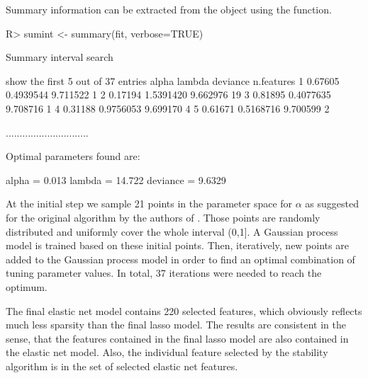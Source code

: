 \documentclass[nojss]{jss}
\begin{document}
Summary information can be extracted from the  object using the  function.
\begin{Schunk}
\begin{Sinput}
R> sumint <- summary(fit, verbose=TRUE)
\end{Sinput}
\begin{Soutput}
Summary interval search 

show the first 5 out of 37 entries
    alpha    lambda deviance n.features
1 0.67605 0.4939544 9.711522          1
2 0.17194 1.5391420 9.662976         19
3 0.81895 0.4077635 9.708716          1
4 0.31188 0.9756053 9.699170          4
5 0.61671 0.5168716 9.700599          2

..............................

 Optimal parameters found are: 

alpha =  0.013 	 lambda =  14.722 deviance =  9.6329
\end{Soutput}
\end{Schunk}

At the initial step we sample 21 points in the parameter space for $\alpha$ as suggested for the original algorithm by the authors of \citep{froehlich2005}. Those points are randomly distributed and uniformly cover the whole interval 
(0,1]. A Gaussian process model is trained based on these initial points. Then, iteratively, new points are added to the Gaussian process model in order to find an optimal combination of tuning parameter values. In total, 37 iterations were needed to reach the optimum. 


The final elastic net model contains 220 selected features, which obviously reflects much less sparsity than the final lasso model.
The results are consistent in the sense, that the features contained in the final lasso model are also contained in the elastic net model. Also, the individual feature selected by the stability algorithm is in the set of selected elastic net features.
\end{document}
